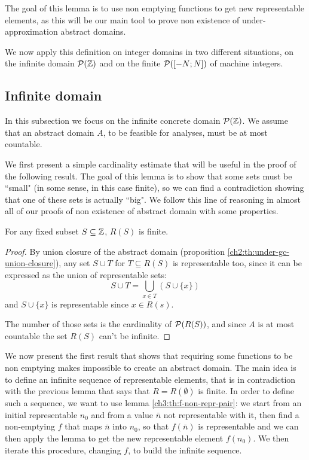 The goal of this lemma is to use non emptying functions to get new representable elements, as this will be our main tool to prove non existence of under-approximation abstract domains.

We now apply this definition on integer domains in two different situations, on the infinite domain $\mathcal{P}(\mathbb{Z})$ and on the finite $\mathcal{P}([-N; N])$ of machine integers.

\subsection{Infinite domain}
In this subsection we focus on the infinite concrete domain $\mathcal{P}(\mathbb{Z})$. We assume that an abstract domain $A$, to be feasible for analyses, must be at most countable.

We first present a simple cardinality estimate that will be useful in the proof of the following result. The goal of this lemma is to show that some sets must be ``small" (in some sense, in this case finite), so we can find a contradiction showing that one of these sets is actually ``big". We follow this line of reasoning in almost all of our proofs of non existence of abstract domain with some properties.

\begin{lemma}\label{ch3:th:R-S-bound-integer-inf}
	For any fixed subset $S \subseteq \mathbb{Z}$, $R(S)$ is finite.
\end{lemma}
\begin{proof}
	By union closure of the abstract domain (proposition \ref{ch2:th:under-gc-union-closure}), any set $S \cup T$ for $T \subseteq R(S)$ is representable too, since it can be expressed as the union of representable sets:
	\[
	S \cup T = \bigcup\limits_{x \in T} (S \cup \{ x \})
	\]
	and $S \cup \{ x \}$ is representable since $x \in R(s)$.

	The number of those sets is the cardinality of $\mathcal{P}(R(S))$, and since $A$ is at most countable the set $R(S)$ can't be infinite.
\end{proof}

We now present the first result that shows that requiring some functions to be non emptying makes impossible to create an abstract domain. The main idea is to define an infinite sequence of representable elements, that is in contradiction with the previous lemma that says that $R = R(\emptyset)$ is finite.
In order to define such a sequence, we want to use lemma \ref{ch3:th:f-non-repr-pair}: we start from an initial representable $n_0$ and from a value $\bar{n}$ not representable with it, then find a non-emptying $f$ that maps $\bar{n}$ into $n_0$, so that $f(\bar{n})$ is representable and we can then apply the lemma to get the new representable element $f(n_0)$. We then iterate this procedure, changing $f$, to build the infinite sequence.

